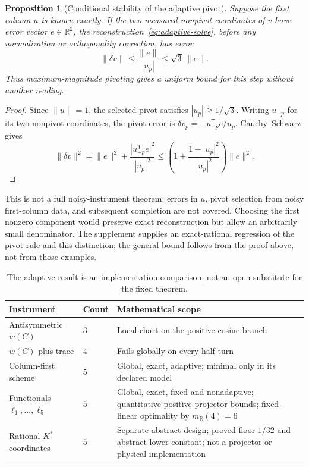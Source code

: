 \documentclass[12pt]{article}
\newtheorem{proposition}[theorem]{Proposition}
\theoremstyle{definition}
\theoremstyle{remark}
\newcommand{\RR}{\mathbb R}
\begin{document}
\begin{proposition}[Conditional stability of the adaptive pivot]
\label{prop:adaptive-stability}
Suppose the first column $u$ is known exactly.  If the two measured
nonpivot coordinates of $v$ have error vector $e\in\mathbb R^2$, the
reconstruction~\eqref{eq:adaptive-solve}, before any normalization or
orthogonality correction, has error
\begin{equation}\label{eq:adaptive-stability}
 \|\delta v\|\leq \frac{\|e\|}{|u_p|}\leq\sqrt3\,\|e\|.
\end{equation}
Thus maximum-magnitude pivoting gives a uniform bound for this step
without another reading.
\end{proposition}
\begin{proof}
Since $\|u\|=1$, the selected pivot satisfies $|u_p|\geq1/\sqrt3$.
Writing $u_{-p}$ for its two nonpivot coordinates, the pivot error is
$\delta v_p=-u_{-p}^{\mathsf T}e/u_p$.  Cauchy--Schwarz gives
\[
 \|\delta v\|^2
 =\|e\|^2+\frac{|u_{-p}^{\mathsf T}e|^2}{|u_p|^2}
 \leq \left(1+\frac{1-|u_p|^2}{|u_p|^2}\right)\|e\|^2.
\]
\end{proof}
This is not a full noisy-instrument theorem: errors in $u$, pivot selection
from noisy first-column data, and subsequent completion are not covered.
Choosing the first nonzero component would preserve exact reconstruction
but allow an arbitrarily small denominator.  The supplement supplies an
exact-rational regression of the pivot rule and this distinction; the
general bound follows from the proof above, not from those examples.

\begin{table}[ht]
\centering
\small
\begin{tabular}{@{}p{}p{}p{}@{}}
\toprule
Instrument & Count & Mathematical scope\\
\midrule
Antisymmetric $w(C)$ & $3$ & Local chart on the positive-cosine branch\\
$w(C)$ plus trace & $4$ & Fails globally on every half-turn\\
Column-first scheme & $5$ & Global, exact, adaptive; minimal only in its
declared model\\
Functionals $\ell_1,\ldots,\ell_5$ & $5$ & Global, exact, fixed and
nonadaptive; quantitative positive-projector bounds; fixed-linear optimality
by $m_{\RR}(4)=6$\\
Rational $K^\ast$ coordinates & $5$ & Separate abstract design;
proved floor $1/32$ and abstract lower constant; not a projector or
physical implementation\\
\bottomrule
\end{tabular}
\caption{The adaptive result is an implementation comparison, not an open
substitute for the fixed theorem.}
\label{tab:tomography-comparison}
\end{table}
\end{document}
